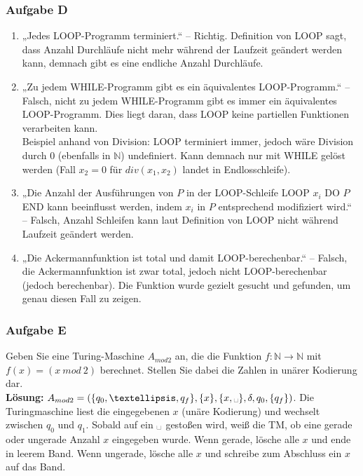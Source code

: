 \subsubsection*{Aufgabe D}
    \begin{enumerate}
        \item „Jedes LOOP-Programm terminiert.“ – Richtig. Definition von LOOP sagt, dass Anzahl Durchläufe nicht mehr während der Laufzeit geändert werden kann, demnach gibt es eine endliche Anzahl Durchläufe.

        \item „Zu jedem WHILE-Programm gibt es ein äquivalentes LOOP-Programm.“ – Falsch, nicht zu jedem WHILE-Programm gibt es immer ein äquivalentes LOOP-Programm. Dies liegt daran, dass LOOP keine partiellen Funktionen verarbeiten kann. \\
        Beispiel anhand von Division: LOOP terminiert immer, jedoch wäre Division durch $0$ (ebenfalls in $\mathbb{N}$) undefiniert. Kann demnach nur mit WHILE gelöst werden (Fall $x_2 = 0$ für $div(x_1, x_2)$ landet in Endlosschleife).

        \item „Die Anzahl der Ausführungen von $P$ in der LOOP-Schleife LOOP $x_i$ DO $P$ END kann beeinflusst werden, indem $x_i$ in $P$ entsprechend modifiziert wird.“ – Falsch, Anzahl Schleifen kann laut Definition von LOOP nicht während Laufzeit geändert werden.

        \item „Die Ackermannfunktion ist total und damit LOOP-berechenbar.“ – Falsch, die Ackermannfunktion ist zwar total, jedoch nicht LOOP-berechenbar (jedoch berechenbar). Die Funktion wurde gezielt gesucht und gefunden, um genau diesen Fall zu zeigen.
    \end{enumerate}

\subsubsection*{Aufgabe E}
    Geben Sie eine Turing-Maschine $A_{mod2}$ an, die die Funktion  $f: \mathbb{N} \to \mathbb{N}$ mit $f(x) = (x~mod~ 2)$ berechnet. Stellen Sie dabei die Zahlen in unärer Kodierung dar. \\
    \textbf{Lösung:} $A_{mod2} = (\{q_0,…,q_f\}, \{x\}, \{x, \blank\}, \delta, q_0, \{q_f\})$. Die Turingmaschine liest die eingegebenen $x$ (unäre Kodierung) und wechselt zwischen $q_0$ und $q_1$. Sobald auf ein $\blank$ gestoßen wird, weiß die TM, ob eine gerade oder ungerade Anzahl $x$ eingegeben wurde. Wenn gerade, lösche alle $x$ und ende in leerem Band. Wenn ungerade, lösche alle $x$ und schreibe zum Abschluss ein $x$ auf das Band.

